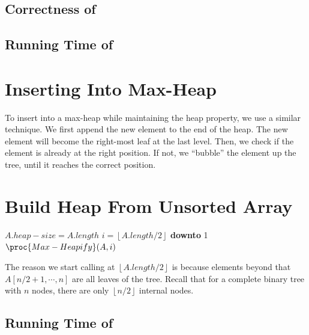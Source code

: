 \subsection{Correctness of }

\subsection{Running Time of }

\section{Inserting Into Max-Heap}

To insert into a max-heap while maintaining the heap property, we use a similar technique. We first append the new element to the end of the heap. The new element will become the right-most leaf at the last level. Then, we check if the element is already at the right position. If not, we ``bubble'' the element up the tree, until it reaches the correct position.

\section{Build Heap From Unsorted Array}

\begin{codebox}
    \li $A.heap-size = A.length$
    \li \For $i = \left\lfloor A.length / 2 \right\rfloor$ \textbf{downto} 1
    \li \Then $\proc{Max-Heapify}(A,i)$
    \End
\end{codebox}


The reason we start calling  at $\left\lfloor A.length / 2 \right\rfloor$ is because elements beyond that $A[n / 2+1, \cdots, n]$ are all leaves of the tree. Recall that for a complete binary tree with $n$ nodes, there are only $\left\lfloor n / 2 \right\rfloor$ internal nodes.

\subsection{Running Time of }

